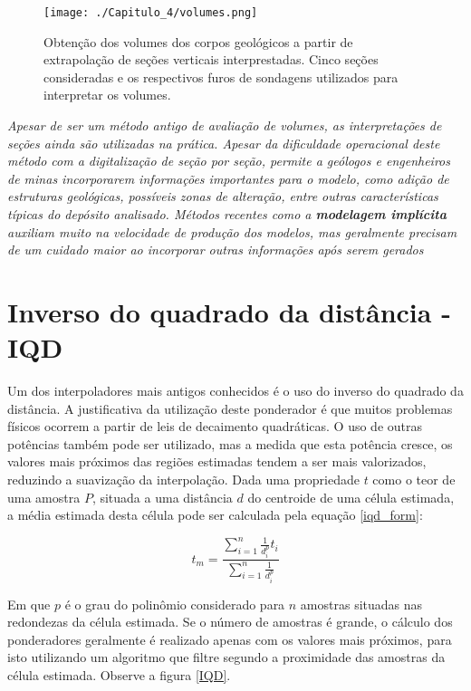 \FloatBarrier
\begin{figure}[!htpb]
	\centering
	\texttt{[image: ./Capitulo\_4/volumes.png]}	
	\caption{Obtenção dos volumes dos corpos geológicos a partir de extrapolação de seções verticais interprestadas. Cinco seções consideradas e os respectivos furos de sondagens utilizados para interpretar os volumes. }
	\label{extrap}
\end{figure}
\FloatBarrier 

\begin{proposition}
	\textit{Apesar de ser um método antigo de avaliação de volumes, as interpretações de seções ainda são utilizadas na prática. Apesar da dificuldade operacional deste método com a digitalização de seção por seção, permite a geólogos e engenheiros de minas incorporarem informações importantes para o modelo, como adição de estruturas geológicas, possíveis zonas de alteração, entre outras características típicas do depósito analisado. Métodos recentes como a \textbf{modelagem implícita} auxiliam muito na velocidade de produção dos modelos, mas geralmente precisam de um cuidado maior ao incorporar outras informações após serem gerados}
\end{proposition}

\section{Inverso do quadrado da distância - IQD} 

Um dos interpoladores mais antigos conhecidos é o uso do inverso do quadrado da distância. A justificativa da utilização deste ponderador é que muitos problemas físicos ocorrem a partir de leis de decaimento quadráticas. O uso de outras potências também pode ser utilizado, mas a medida que esta potência cresce, os valores mais próximos das regiões estimadas tendem a ser mais valorizados, reduzindo a suavização da interpolação. Dada uma propriedade $t$ como  o teor de uma amostra $P$, situada a uma distância $d$ do centroide de uma célula estimada, a média estimada desta célula pode ser calculada pela equação \eqref{iqd_form}: 

\begin{equation}\label{iqd_form} 
t_{m} = \frac{\sum_{i=1}^{n}\frac{1}{d_{i}^{p}}t_{i}}{\sum_{i=1}^{n}\frac{1}{d_{i}^{p}}}
\end{equation} 

Em que $p$ é o grau do polinômio considerado para $n$ amostras situadas nas redondezas da célula estimada. Se o número de amostras é grande, o cálculo dos ponderadores geralmente é realizado apenas com os valores mais próximos, para isto utilizando um algoritmo que filtre segundo a proximidade das amostras da célula estimada. Observe a figura \ref{IQD}.

